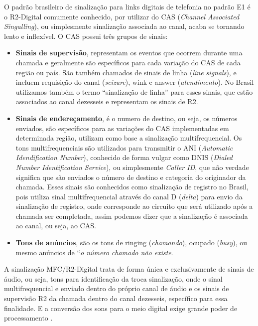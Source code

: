 
O padrão brasileiro de sinalização para links digitais de telefonia no padrão E1 é o R2-Digital comumente conhecido, por utilizar do CAS (\textit{Channel Associated Singalling}), ou simplesmente sinalização associada ao canal, acaba se tornando lento e inflexível. O CAS possui três grupos de sinais: \cite{thiagowinkler2007}

\begin{itemize}
  \item \textbf{Sinais de supervisão}, representam os eventos que ocorrem durante uma chamada e geralmente são específicos para cada variação do CAS de cada região ou país. São também chamados de sinais de linha (\textit{line signals}), e incluem requisição do canal (\textit{seizure}), wink e answer (\textit{atendimento}). No Brasil utilizamos  também o termo “sinalização de linha” para esses sinais, que estão associados ao canal dezesseis e representam os sinais de R2.
  \item \textbf{Sinais de endereçamento}, é o numero de destino, ou seja, os números enviados, são específicos para as variações do CAS implementadas em determinada região, utilizam como base a sinalização multifrequencial. Os tons multifrequenciais são utilizados para transmitir o ANI (\textit{Automatic Idendification Number}), conhecido de forma vulgar como DNIS (\textit{Dialed Number Identification Service}), ou simplesmente \textit{Caller ID}, que não verdade significa que são enviados o número de destino e categoria do originador da chamada. Esses sinais são conhecidos como sinalização de registro no Brasil, pois utiliza sinal multifrequencial através do canal D (\textit{delta}) para envio da sinalização de registro, onde corresponde ao circuito que será utilizado após a chamada ser completada, assim podemos dizer que a sinalização é associada ao canal, ou seja, ao CAS.
  \item \textbf{Tons de anúncios}, são os tons de ringing (\textit{chamando}), ocupado (\textit{busy}), ou mesmo anúncios de “\textit{o número chamado não existe}.
\end{itemize}

A sinalização MFC/R2-Digital trata de forma única e exclusivamente de sinais de áudio, ou seja, tons para identificação da troca sinalização, onde o sinal multifrequencial e enviado dentro do próprio canal de áudio e os sinais de supervisão R2 da chamada dentro do canal dezesseis, específico para essa finalidade. E a conversão dos sons para o meio digital exige grande poder de processamento \cite{davidson2008}.

